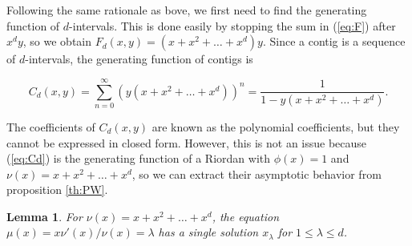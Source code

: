 \documentclass{article}
\newtheorem{lemma}{Lemma}
\begin{document}
Following the same rationale as bove, we first need to find the generating
function of $d$-intervals. This is done easily by stopping the sum in
(\ref{eq:F}) after $x^dy$, so we obtain $F_d(x,y) = (x+x^2+\ldots+x^d)y$.
Since a contig is a sequence of $d$-intervals, the generating function of
contigs is

\begin{equation}
\label{eq:Cd}
C_d(x,y) = \sum_{n=0}^\infty \left(y(x+x^2+\ldots+x^d)\right)^n =
\frac{1}{1-y(x+x^2+\ldots+x^d)}.
\end{equation}

The coefficients of $C_d(x,y)$ are known as the polynomial coefficients,
but they cannot be expressed in closed form. However, this is not an issue
because (\ref{eq:Cd}) is the generating function of a Riordan with
$\phi(x) = 1$ and $\nu(x) = x + x^2 + \ldots + x^d$, so we can extract
their asymptotic behavior from proposition \ref{th:PW}.

\begin{lemma}
\label{th:mu}
For $\nu(x) = x+x^2+\ldots+x^d$, the equation $\mu(x) = x\nu'(x)/\nu(x) =
\lambda$ has a single solution $x_\lambda$ for $1 \leq \lambda \leq d$.
\end{lemma}
\end{document}
